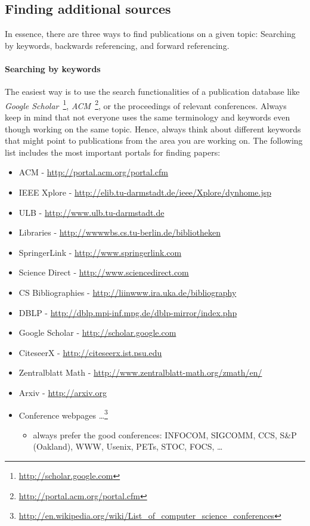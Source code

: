 \documentclass{article}
\begin{document}
\subsection{Finding additional sources}

In essence, there are three ways to find publications on a given topic: Searching by keywords, backwards referencing, and forward referencing.

\paragraph{Searching by keywords}

The easiest way is to use the search functionalities of a publication database like \emph{Google Scholar}~\footnote{\url{http://scholar.google.com}}, \emph{ACM}~\footnote{\url{http://portal.acm.org/portal.cfm}}, or the proceedings of relevant conferences.
Always keep in mind that not everyone uses the same terminology and keywords even though working on the same topic.
Hence, always think about different keywords that might point to publications from the area you are working on.
The following list includes the most important portals for finding papers:

\begin{itemize}
	\item ACM - \url{http://portal.acm.org/portal.cfm}
	\item IEEE Xplore - \url{http://elib.tu-darmstadt.de/ieee/Xplore/dynhome.jsp}
	\item ULB - \url{http://www.ulb.tu-darmstadt.de}
	\item Libraries - \url{http://wwwwbs.cs.tu-berlin.de/bibliotheken}
	\item SpringerLink - \url{http://www.springerlink.com}
	\item Science Direct - \url{http://www.sciencedirect.com}
	\item CS Bibliographies - \url{http://liinwww.ira.uka.de/bibliography}
	\item DBLP - \url{http://dblp.mpi-inf.mpg.de/dblp-mirror/index.php}
	\item Google Scholar - \url{http://scholar.google.com}
	\item CiteseerX - \url{http://citeseerx.ist.psu.edu}
	\item Zentralblatt Math - \url{http://www.zentralblatt-math.org/zmath/en/}
	\item Arxiv - \url{http://arxiv.org}
	\item Conference webpages \dots \footnote{\url{http://en.wikipedia.org/wiki/List_of_computer_science_conferences}}
	\begin{itemize}
		\item always prefer the good conferences: INFOCOM, SIGCOMM, CCS, S\&P (Oakland), WWW, Usenix, PETs, STOC, FOCS, \dots
	\end{itemize}
\end{itemize}
\end{document}
